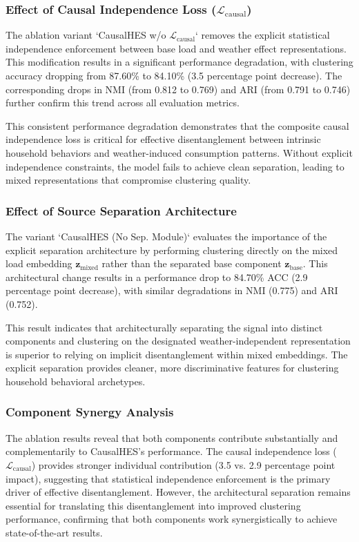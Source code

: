 \documentclass[journal]{IEEEtran}
\begin{document}
\subsubsection{Effect of Causal Independence Loss ($\mathcal{L}_{\text{causal}}$)}
The ablation variant `CausalHES w/o $\mathcal{L}_{\text{causal}}$` removes the explicit statistical independence enforcement between base load and weather effect representations. This modification results in a significant performance degradation, with clustering accuracy dropping from 87.60\% to 84.10\% (3.5 percentage point decrease). The corresponding drops in NMI (from 0.812 to 0.769) and ARI (from 0.791 to 0.746) further confirm this trend across all evaluation metrics.

This consistent performance degradation demonstrates that the composite causal independence loss is critical for effective disentanglement between intrinsic household behaviors and weather-induced consumption patterns. Without explicit independence constraints, the model fails to achieve clean separation, leading to mixed representations that compromise clustering quality.

\subsubsection{Effect of Source Separation Architecture}
The variant `CausalHES (No Sep. Module)` evaluates the importance of the explicit separation architecture by performing clustering directly on the mixed load embedding $\mathbf{z}_{\text{mixed}}$ rather than the separated base component $\mathbf{z}_{\text{base}}$. This architectural change results in a performance drop to 84.70\% ACC (2.9 percentage point decrease), with similar degradations in NMI (0.775) and ARI (0.752).

This result indicates that architecturally separating the signal into distinct components and clustering on the designated weather-independent representation is superior to relying on implicit disentanglement within mixed embeddings. The explicit separation provides cleaner, more discriminative features for clustering household behavioral archetypes.

\subsubsection{Component Synergy Analysis}
The ablation results reveal that both components contribute substantially and complementarily to CausalHES's performance. The causal independence loss ($\mathcal{L}_{\text{causal}}$) provides stronger individual contribution (3.5 vs. 2.9 percentage point impact), suggesting that statistical independence enforcement is the primary driver of effective disentanglement. However, the architectural separation remains essential for translating this disentanglement into improved clustering performance, confirming that both components work synergistically to achieve state-of-the-art results.
\end{document}
